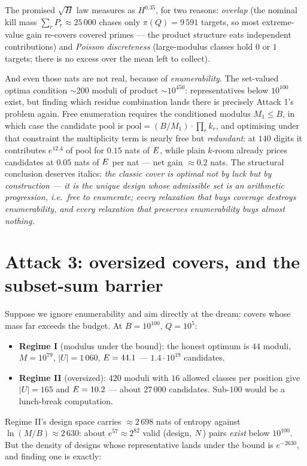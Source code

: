 The promised $\sqrt H$ law measures as $H^{0.35}$, for two reasons:
\emph{overlap} (the nominal kill mass $\sum_rP_r\approx25\,000$ chases
only $\pi(Q)=9\,591$ targets, so most extreme-value gain re-covers
covered primes --- the product structure eats independent
contributions) and \emph{Poisson discreteness} (large-modulus classes
hold $0$ or $1$ targets; there is no excess over the mean left to
collect).

And even those nats are not real, because of \emph{enumerability}. The
set-valued optima condition $\sim$200 moduli of product
$\sim10^{450}$: representatives below $10^{100}$ exist, but finding
which residue combination lands there is precisely Attack 1's problem
again. Free enumeration requires the conditioned modulus $M_1\le B$, in
which case the candidate pool is
$\mathrm{pool}=(B/M_1)\cdot\prod_rk_r$, and optimising under that
constraint the multiplicity term is nearly free but \emph{redundant}:
at $140$ digits it contributes $e^{12.4}$ of pool for $0.15$ nats of
$E$, while plain $k$-room already prices candidates at $0.05$ nats of
$E$ per nat --- net gain $\approx0.2$ nats. The structural conclusion
deserves italics: \emph{the classic cover is optimal not by luck but by
construction --- it is the unique design whose admissible set is an
arithmetic progression, i.e.\ free to enumerate; every relaxation that
buys coverage destroys enumerability, and every relaxation that
preserves enumerability buys almost nothing.}

\section{Attack 3: oversized covers, and the subset-sum barrier}\label{sec:subsetsum}

Suppose we ignore enumerability and aim directly at the dream: covers
whose mass far exceeds the budget. At $B=10^{100}$, $Q=10^5$:
\begin{itemize}
\item \textbf{Regime I} (modulus under the bound): the honest optimum
is $44$ moduli, $M=10^{79}$, $|U|=1\,060$, $E=44.1$ ---
$1.4\cdot10^{19}$ candidates.
\item \textbf{Regime II} (oversized): $420$ moduli with $16$ allowed
classes per position give $|U|=165$ and $E=10.2$ --- about
$27\,000$ candidates. Sub-$100$ would be a lunch-break computation.
\end{itemize}
Regime II's design space carries $\approx2\,698$ nats of entropy
against $\ln(M/B)\approx2\,630$: about $e^{57}\approx2^{82}$ valid
(design, $N$) pairs \emph{exist} below $10^{100}$. But the density of
designs whose representative lands under the bound is $e^{-2630}$, and
finding one is exactly:

